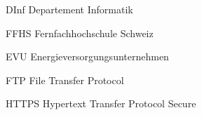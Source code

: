 \begin{abkuerzungen}[MUSTER] %
    \item[DInf] Departement Informatik
    \item[FFHS] Fernfachhochschule Schweiz
    \item[EVU]  Energieversorgungsunternehmen
    \item[FTP]  File Transfer Protocol
    \item[HTTPS]  Hypertext Transfer Protocol Secure
\end{abkuerzungen}